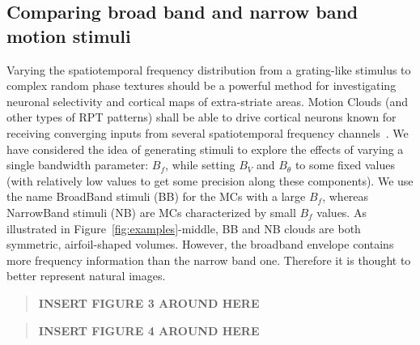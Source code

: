 \documentclass[a4paper,11pt]{article}%
\begin{document}
\subsection{Comparing broad band and narrow band motion stimuli}%

Varying the spatiotemporal frequency distribution from a grating-like stimulus to complex random phase textures should be a powerful method for investigating neuronal selectivity and cortical maps of extra-striate areas. Motion Clouds (and other types of RPT patterns) shall be able to drive cortical neurons known for receiving converging inputs from several spatiotemporal frequency channels~\citep{Rust05}. We have considered the idea of generating stimuli to explore the effects of varying a single bandwidth parameter: $B_{f}$, while setting $B_{V}$ and $B_{\theta}$ to some fixed values (with relatively low values to get some precision along these components). We use the name BroadBand stimuli (BB) for the MCs with a large $B_{f}$, whereas NarrowBand stimuli (NB) are MCs characterized by small $B_{f}$ values. As illustrated in Figure~\ref{fig:examples}-middle, BB and NB clouds are both symmetric, airfoil-shaped volumes. However, the broadband envelope contains more frequency information than the narrow band one. Therefore it is thought to better represent natural images. %

\begin{quote}
	\begin{center}
		\textbf{INSERT FIGURE 3 AROUND HERE}
	\end{center}
\end{quote}

\begin{quote}
	\begin{center}
		\textbf{INSERT FIGURE 4 AROUND HERE}
	\end{center}
\end{quote}
\end{document}
